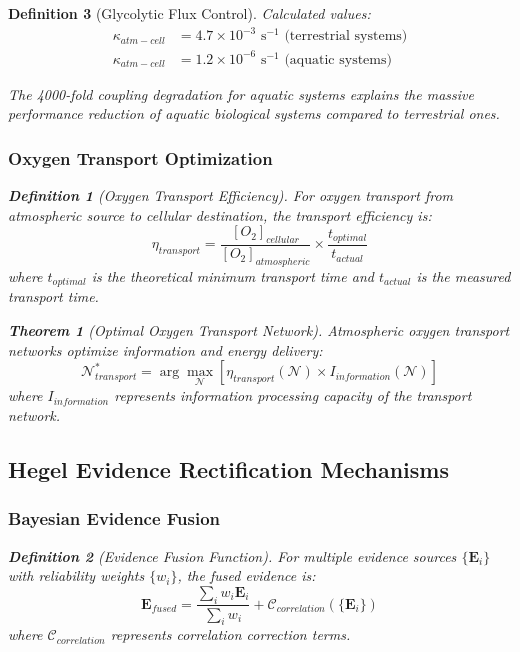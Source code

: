 \documentclass[12pt,a4paper]{article}
\newtheorem{theorem}{Theorem}
\newtheorem{definition}{Definition}
\begin{document}
\begin{definition}[Glycolytic Flux Control]
Calculated values:
\begin{align}
\kappa_{atm-cell} &= 4.7 \times 10^{-3} \text{ s}^{-1} \text{ (terrestrial systems)} \\
\kappa_{atm-cell} &= 1.2 \times 10^{-6} \text{ s}^{-1} \text{ (aquatic systems)}
\end{align}

The 4000-fold coupling degradation for aquatic systems explains the massive performance reduction of aquatic biological systems compared to terrestrial ones.

\subsubsection{Oxygen Transport Optimization}

\begin{definition}[Oxygen Transport Efficiency]
For oxygen transport from atmospheric source to cellular destination, the transport efficiency is:
\begin{equation}
\eta_{transport} = \frac{[O_2]_{cellular}}{[O_2]_{atmospheric}} \times \frac{t_{optimal}}{t_{actual}}
\end{equation}
where $t_{optimal}$ is the theoretical minimum transport time and $t_{actual}$ is the measured transport time.
\end{definition}

\begin{theorem}[Optimal Oxygen Transport Network]
Atmospheric oxygen transport networks optimize information and energy delivery:
\begin{equation}
\mathcal{N}_{transport}^* = \arg\max_{\mathcal{N}} \left[ \eta_{transport}(\mathcal{N}) \times I_{information}(\mathcal{N}) \right]
\end{equation}
where $I_{information}$ represents information processing capacity of the transport network.
\end{theorem}

\subsection{Hegel Evidence Rectification Mechanisms}

\subsubsection{Bayesian Evidence Fusion}

\begin{definition}[Evidence Fusion Function]
For multiple evidence sources $\{\mathbf{E}_i\}$ with reliability weights $\{w_i\}$, the fused evidence is:
\begin{equation}
\mathbf{E}_{fused} = \frac{\sum_i w_i \mathbf{E}_i}{\sum_i w_i} + \mathcal{C}_{correlation}(\{\mathbf{E}_i\})
\end{equation}
where $\mathcal{C}_{correlation}$ represents correlation correction terms.
\end{definition}


\end{definition}
\end{document}

